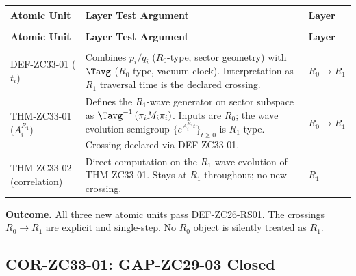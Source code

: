 \documentclass[12pt, a4paper]{article}
\begin{document}
\begin{derivedbox}[title={Layer test of THM-ZC33-01 and
  THM-ZC33-02}]
{\small
\setlength{\LTpre}{4pt}
\setlength{\LTpost}{4pt}
\renewcommand{\arraystretch}{1.30}
\begin{longtable}{>{\raggedright\arraybackslash}p{3.0cm}
                  >{\raggedright\arraybackslash}p{6.8cm}
                  >{\centering\arraybackslash}p{2.4cm}}
\toprule
\textbf{Atomic Unit} & \textbf{Layer Test Argument}
  & \textbf{Layer}\\
\midrule
\endfirsthead
\multicolumn{3}{l}{\small\textit{(continued)}}\\[4pt]
\toprule
\textbf{Atomic Unit} & \textbf{Layer Test Argument}
  & \textbf{Layer}\\
\midrule
\endhead
\midrule
\multicolumn{3}{r}{\small\textit{(continues)}}\\
\endfoot
\bottomrule
\endlastfoot
DEF-ZC33-01 ($t_i$)
  & Combines $p_i/q_i$ ($R_0$-type, sector geometry) with
    $\Tavg$ ($R_0$-type, vacuum clock). Interpretation as
    $R_1$ traversal time is the declared crossing.
  & $R_0 \to R_1$ \\
THM-ZC33-01 ($A_i^{R_1}$)
  & Defines the $R_1$-wave generator on sector subspace
    as $\Tavg^{-1}\,(\pi_i M_i \pi_i)$. Inputs are $R_0$;
    the wave evolution semigroup
    $\{e^{A_i^{R_1} t}\}_{t\geq 0}$ is $R_1$-type.
    Crossing declared via DEF-ZC33-01.
  & $R_0 \to R_1$ \\
THM-ZC33-02 (correlation)
  & Direct computation on the $R_1$-wave evolution of
    THM-ZC33-01. Stays at $R_1$ throughout; no new crossing.
  & $R_1$ \\
\end{longtable}
}

\textbf{Outcome.} All three new atomic units pass
DEF-ZC26-RS01. The crossings $R_0\to R_1$ are explicit and
single-step. No $R_0$ object is silently treated as $R_1$.
\end{derivedbox}

\subsection{COR-ZC33-01: GAP-ZC29-03 Closed}
\label{sec:cor-zc33-01}
\end{document}
